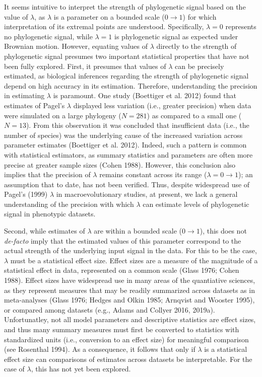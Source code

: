 \documentclass[
]{article}
\begin{document}
It seems intuitive to interpret the strength of phylogenetic signal
based on the value of \(\lambda\), as \(\lambda\) is a parameter on a
bounded scale (\(0\to1\)) for which interpretation of its extremal
points are understood. Specifically, \(\lambda=0\) represents no
phylogenetic signal, while \(\lambda=1\) is phylogenetic signal as
expected under Brownian motion. However, equating values of \(\lambda\)
directly to the strength of phylogenetic signal presumes two important
statistical properties that have not been fully explored. First, it
presumes that values of \(\lambda\) can be precisely estimated, as
biological inferences regarding the strength of phylogenetic signal
depend on high accuracy in its estimation. Therefore, understanding the
precision in estimating \(\lambda\) is paramount. One study (Boettiger
et al. 2012) found that estimates of Pagel's \(\lambda\) displayed less
variation (i.e., greater precision) when data were simulated on a large
phylogeny (\(N=281\)) as compared to a small one (\(N=13\)). From this
observation it was concluded that insufficient data (i.e., the number of
species) was the underlying cause of the increased variation across
parameter estimates (Boettiger et al. 2012). Indeed, such a pattern is
common with statistical estimators, as summary statistics and parameters
are often more precise at greater sample sizes (Cohen 1988). However,
this conclusion also implies that the precision of \(\lambda\) remains
constant across its range (\(\lambda = 0 \to 1\)); an assumption that to
date, has not been verified. Thus, despite widespread use of Pagel's
(1999) \(\lambda\) in macroevolutionary studies, at present, we lack a
general understanding of the precision with which \(\lambda\) can
estimate levels of phylogenetic signal in phenotypic datasets.
\hfill\break

Second, while estimates of \(\lambda\) are within a bounded scale
(\(0\to1\)), this does not \emph{de-facto} imply that the estimated
values of this parameter correspond to the actual strength of the
underlying input signal in the data. For this to be the case,
\(\lambda\) must be a statistical effect size. Effect sizes are a
measure of the magnitude of a statistical effect in data, represented on
a common scale (Glass 1976; Cohen 1988). Effect sizes have widespread
use in many areas of the quantiative sciences, as they represent
measures that may be readily summarized across datasets as in
meta-analyses (Glass 1976; Hedges and Olkin 1985; Arnqvist and Wooster
1995), or compared among datasets (e.g., Adams and Collyer 2016, 2019a).
Unfortunatley, not all model parameters and descriptive statistics are
effect sizes, and thus many summary measures must first be converted to
statistics with standardized units (i.e., conversion to an effect size)
for meaningful comparison (see Rosenthal 1994). As a consequence, it
follows that only if \(\lambda\) is a statistical effect size can
comparisons of estimates across datasets be interpretable. For the case
of \(\lambda\), this has not yet been explored. \hfill\break
\end{document}
